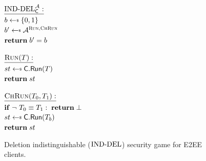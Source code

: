 \begin{figure}[t!]
    \centering
	{
		$\procedurev{\SecDef_{\client}^{\advA}}$ \\
		$b \getsr \{0, 1\}$ \\
		$b' \getsr \advA^{\RunOracle, \ChRunOracle}$ \\
		$\mathbf{return\;} b' = b$ \medskip

		$\procedurev{\RunOracle(\transcript)}$ \\
		$\appState \getsr \client.\Run(\transcript)$ \\
		$\mathbf{return\;} st$
	}
	{
		$\procedurev{\ChRunOracle(\transcript_0, \transcript_1)}$ \\
		$\mathbf{if\;} \neg\ T_0 \equiv T_1: \; \mathbf{return\;} \bot$ \\
		$\appState \getsr \client.\Run(\transcript_b)$ \\
		$\mathbf{return\;} st$
	}
  \caption{Deletion indistinguishable ($\textnormal{IND-DEL}$) security game for E2EE clients.}
	\label{fig:ind-del-def}
\end{figure}
